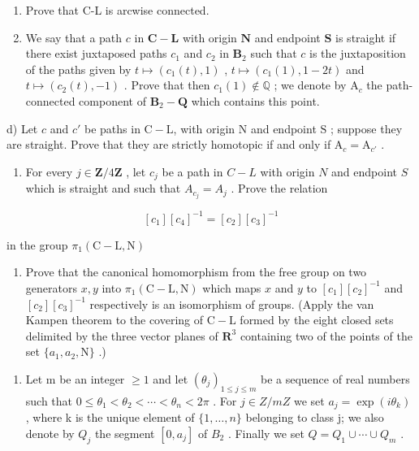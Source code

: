\begin{enumerate}
\def\labelenumi{\alph{enumi})}
\setcounter{enumi}{1}
\item
  Prove that C-L is arcwise connected.
\item
  We say that a path \(c\) in \(\mathbf{C} - \mathbf{L}\) with origin \(\mathbf{N}\) and endpoint \(\mathbf{S}\) is straight if there exist juxtaposed paths \(c_1\) and \(c_2\) in \(\mathbf{B}_2\) such that \(c\) is the juxtaposition of the paths given by \(t \mapsto (c_1(t), 1)\) , \(t \mapsto (c_1(1), 1 - 2t)\) and \(t \mapsto (c_2(t), -1)\) . Prove that then \(c_1(1) \not\in \mathbb{Q}\) ; we denote by \(\mathrm{A}_c\) the path-connected component of \(\mathbf{B}_2 - \mathbf{Q}\) which contains this point.
\end{enumerate}

d) Let \(c\) and \(c'\) be paths in \(\mathrm{C} - \mathrm{L}\), with origin \(\mathrm{N}\) and endpoint \(\mathrm{S}\) ; suppose they are straight. Prove that they are strictly homotopic if and only if \(\mathrm{A}_c = \mathrm{A}_{c'}\) .

\begin{enumerate}
\def\labelenumi{\alph{enumi})}
\setcounter{enumi}{4}
\tightlist
\item
  For every \(j \in \mathbf{Z}/4\mathbf{Z}\) , let \(c_j\) be a path in \(C-L\) with origin \(N\) and endpoint \(S\) which is straight and such that \(A_{c_j} = A_j\) . Prove the relation
\end{enumerate}

\[
[ c _ {1} ] [ c _ {4} ] ^ {- 1} = [ c _ {2} ] [ c _ {3} ] ^ {- 1}
\]

in the group \(\pi_1(\mathrm{C} - \mathrm{L},\mathrm{N})\)

\begin{enumerate}
\def\labelenumi{\alph{enumi})}
\setcounter{enumi}{5}
\tightlist
\item
   Prove that the canonical homomorphism from the free group on two generators \(x, y\) into \(\pi_1(\mathrm{C} - \mathrm{L}, \mathrm{N})\) which maps \(x\) and \(y\) to \([c_1][c_2]^{-1}\) and \([c_2][c_3]^{-1}\) respectively is an isomorphism of groups. (Apply the van Kampen theorem to the covering of \(\mathrm{C} - \mathrm{L}\) formed by the eight closed sets delimited by the three vector planes of \(\mathbf{R}^3\) containing two of the points of the set \(\{a_1, a_2, \mathrm{N}\}\) .)
\end{enumerate}

\begin{enumerate}
\def\labelenumi{\arabic{enumi})}
\setcounter{enumi}{23}
\tightlist
\item
   Let m be an integer \(\geqslant 1\) and let \((\theta_{j})_{1\leqslant j\leqslant m}\) be a sequence of real numbers such that \(0\leqslant\theta_{1}<\theta_{2}<\cdots<\theta_{n}<2\pi\) . For \(j\in Z/mZ\) we set \(a_{j}=\exp(i\theta_{k})\) , where k is the unique element of \(\{1,\ldots,n\}\) belonging to class j; we also denote by \(Q_{j}\) the segment \([0,a_{j}]\) of \(B_{2}\) . Finally we set \(Q=Q_{1}\cup\cdots\cup Q_{m}\) .
\end{enumerate}

